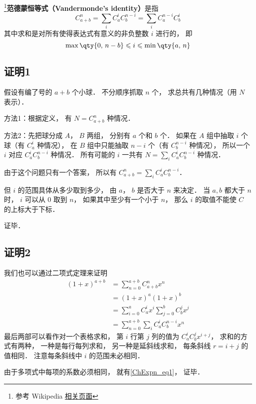 

\footnote{参考 Wikipedia \href{https://en.wikipedia.org/wiki/Vandermonde's_identity}{相关页面}}\textbf{范德蒙恒等式（Vandermonde's identity）}是指
\begin{equation}\label{ChExpn_eq1}
C_{a + b}^n = \sum_i C_a^i C_b^{n-i} = \sum\limits_i C_a^{n-i}C_b^i
\end{equation}
其中求和是对所有使得表达式有意义的非负整数 $i$ 进行的， 即
\begin{equation}
\max\qty{0,\, n-b} \leqslant i \leqslant \min\qty{a,\, n}
\end{equation}

\subsection{证明1}

假设有编了号的 $a+b$ 个小球． 不分顺序抓取 $n$ 个， 求总共有几种情况（用 $N$ 表示）．

方法1：根据定义， 有 $N = C_{a+b}^n$ 种情况．

方法2：先把球分成 $A$，  $B$ 两组， 分别有 $a$ 个和 $b$ 个． 如果在 $A$ 组中抽取 $i$ 个球（有 $C_a^i$ 种情况）， 在 $B$ 组中只能抽取  $n - i$ 个（有 $C_b^{n-i}$ 种情况）， 所以一个 $i$ 对应 $C_a^i C_b^{n-i}$ 种情况． 所有可能的 $i$ 一共有 $N = \sum_i C_a^i C_b^{n-i}$ 种情况．

由于这个问题只有一个答案， 所以有 $C_{a+b}^n = \sum_i C_a^i C_b^{n-i}$． 

但 $i$ 的范围具体从多少取到多少， 由 $a$，  $b$ 是否大于 $n$ 来决定． 当 $a,b$ 都大于 $n$ 时， $i$ 可以从 0 取到 $n$，  如果其中至少有一个小于 $n$，  那么 $i$ 的取值不能使 $C$ 的上标大于下标．

证毕．

\subsection{证明2}
我们也可以通过二项式定理来证明
\begin{equation}
\begin{aligned}
(1 + x)^{a+b} &= \sum_{n=0}^{a+b} C_{a+b}^n x^n\\
&=(1+x)^a (1+x)^b\\
&=\sum_{i=0}^a C_a^i x^i  \sum_{j=0}^b C_b^j x^j\\
&=\sum_{n=0}^{a+b} \sum_{i} C_a^i C_b^{n-i} x^n
\end{aligned}
\end{equation}
最后两部可以看作对一个表格求和， 第 $i$ 行第 $j$ 列的值为 $C_a^i C_b^j x^{i+j}$， 求和的方式有两种， 一种是每行每列求和， 另一种是延斜线求和， 每条斜线 $r = i+j$ 的值相同． 注意每条斜线中 $i$ 的范围未必相同．

由于多项式中每项的系数必须相同， 就有\autoref{ChExpn_eq1}， 证毕．
